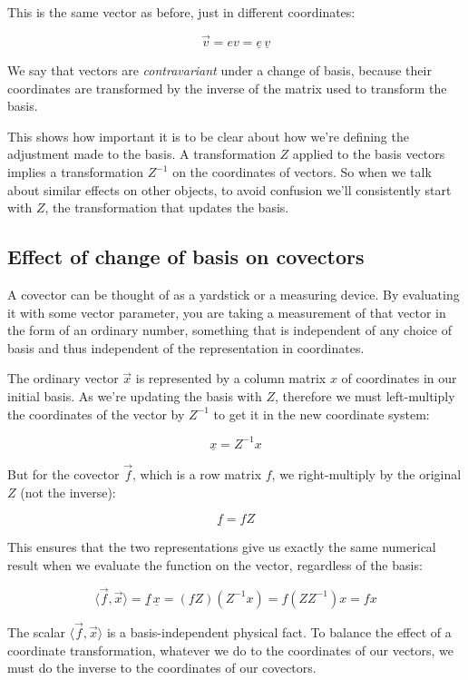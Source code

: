This is the same vector as before, just in different coordinates:

$$\vec{v} = ev = \underline{e} \, \underline{v}$$

We say that vectors are \textit{contravariant} under a change of basis, because their coordinates are transformed by the inverse of the matrix used to transform the basis.

This shows how important it is to be clear about how we're defining the adjustment made to the basis. A transformation $Z$ applied to the basis vectors implies a transformation $Z^{-1}$ on the coordinates of vectors. So when we talk about similar effects on other objects, to avoid confusion we'll consistently start with $Z$, the transformation that updates the basis.

\subsection{Effect of change of basis on covectors} \label{sec:vector-grow-shrink}

A covector can be thought of as a yardstick or a measuring device. By evaluating it with some vector parameter, you are taking a measurement of that vector in the form of an ordinary number, something that is independent of any choice of basis and thus independent of the representation in coordinates.

The ordinary vector $\vec{x}$ is represented by a column matrix $x$ of coordinates in our initial basis. As we're updating the basis with $Z$, therefore we must left-multiply the coordinates of the vector by $Z^{-1}$ to get it in the new coordinate system:

$$
\underline{x} = Z^{-1} x
$$

But for the covector $\vec{f}$, which is a row matrix $f$, we right-multiply by the original $Z$ (not the inverse):

$$
\underline{f} = f Z
$$

This ensures that the two representations give us exactly the same numerical result when we evaluate the function on the vector, regardless of the basis:

$$
\langle \vec{f}, \vec{x} \rangle = \underline{f} \, \underline{x} = (f Z) (Z^{-1} x) = f (Z Z^{-1}) x = fx
$$

The scalar $\langle \vec{f}, \vec{x} \rangle$ is a basis-independent physical fact. To balance the effect of a coordinate transformation, whatever we do to the coordinates of our vectors, we must do the inverse to the coordinates of our covectors.

